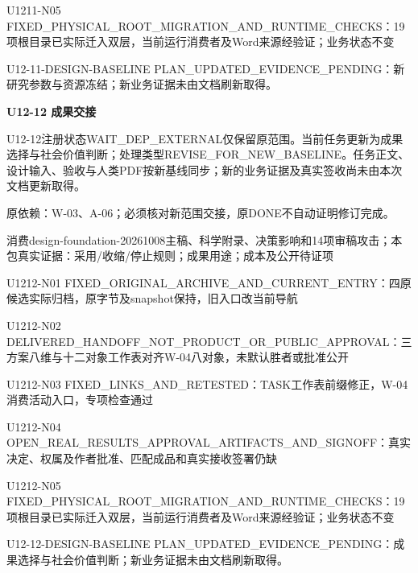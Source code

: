 \documentclass[11pt,a4paper]{article}
\newcommand{\reviewsection}[1]{\par\Needspace{5\baselineskip}\vspace{10pt}\begin{center}{\titlelatin\titlecjk\bfseries\fontsize{14}{20}\selectfont #1}\end{center}}
\begin{document}
U1211-\allowbreak{}N05 FIXED\_\allowbreak{}PHYSICAL\_\allowbreak{}ROOT\_\allowbreak{}MIGRATION\_\allowbreak{}AND\_\allowbreak{}RUNTIME\_\allowbreak{}CHECKS：19项根目录已实际迁入双层，当前运行消费者及Word来源经验证；业务状态不变


U12-\allowbreak{}11-\allowbreak{}DESIGN-\allowbreak{}BASELINE PLAN\_\allowbreak{}UPDATED\_\allowbreak{}EVIDENCE\_\allowbreak{}PENDING：新研究参数与资源冻结；新业务证据未由文档刷新取得。


\reviewsection{U12-\allowbreak{}12 成果交接}
U12-\allowbreak{}12注册状态WAIT\_\allowbreak{}DEP\_\allowbreak{}EXTERNAL仅保留原范围。当前任务更新为成果选择与社会价值判断；处理类型REVISE\_\allowbreak{}FOR\_\allowbreak{}NEW\_\allowbreak{}BASELINE。任务正文、设计输入、验收与人类PDF按新基线同步；新的业务证据及真实签收尚未由本次文档更新取得。


原依赖：W-\allowbreak{}03、A-\allowbreak{}06；必须核对新范围交接，原DONE不自动证明修订完成。


消费design-\allowbreak{}foundation-\allowbreak{}20261008主稿、科学附录、决策影响和14项审稿攻击；本包真实证据：采用/\allowbreak{}收缩/\allowbreak{}停止规则；成果用途；成本及公开待证项


U1212-\allowbreak{}N01 FIXED\_\allowbreak{}ORIGINAL\_\allowbreak{}ARCHIVE\_\allowbreak{}AND\_\allowbreak{}CURRENT\_\allowbreak{}ENTRY：四原候选实际归档，原字节及snapshot保持，旧入口改当前导航


U1212-\allowbreak{}N02 DELIVERED\_\allowbreak{}HANDOFF\_\allowbreak{}NOT\_\allowbreak{}PRODUCT\_\allowbreak{}OR\_\allowbreak{}PUBLIC\_\allowbreak{}APPROVAL：三方案八维与十二对象工作表对齐W-\allowbreak{}04八对象，未默认胜者或批准公开


U1212-\allowbreak{}N03 FIXED\_\allowbreak{}LINKS\_\allowbreak{}AND\_\allowbreak{}RETESTED：TASK工作表前缀修正，W-\allowbreak{}04消费活动入口，专项检查通过


U1212-\allowbreak{}N04 OPEN\_\allowbreak{}REAL\_\allowbreak{}RESULTS\_\allowbreak{}APPROVAL\_\allowbreak{}ARTIFACTS\_\allowbreak{}AND\_\allowbreak{}SIGNOFF：真实决定、权属及作者批准、匹配成品和真实接收签署仍缺


U1212-\allowbreak{}N05 FIXED\_\allowbreak{}PHYSICAL\_\allowbreak{}ROOT\_\allowbreak{}MIGRATION\_\allowbreak{}AND\_\allowbreak{}RUNTIME\_\allowbreak{}CHECKS：19项根目录已实际迁入双层，当前运行消费者及Word来源经验证；业务状态不变


U12-\allowbreak{}12-\allowbreak{}DESIGN-\allowbreak{}BASELINE PLAN\_\allowbreak{}UPDATED\_\allowbreak{}EVIDENCE\_\allowbreak{}PENDING：成果选择与社会价值判断；新业务证据未由文档刷新取得。
\end{document}
